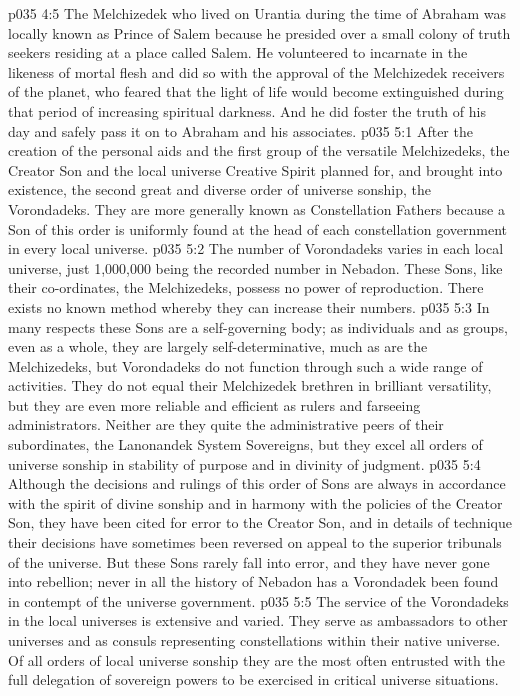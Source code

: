 \vs p035 4:5 \pc The Melchizedek who lived on Urantia during the time of Abraham was locally known as Prince of Salem because he presided over a small colony of truth seekers residing at a place called Salem. He volunteered to incarnate in the likeness of mortal flesh and did so with the approval of the Melchizedek receivers of the planet, who feared that the light of life would become extinguished during that period of increasing spiritual darkness. And he did foster the truth of his day and safely pass it on to Abraham and his associates.
\vs p035 5:1 After the creation of the personal aids and the first group of the versatile Melchizedeks, the Creator Son and the local universe Creative Spirit planned for, and brought into existence, the second great and diverse order of universe sonship, the Vorondadeks. They are more generally known as Constellation Fathers because a Son of this order is uniformly found at the head of each constellation government in every local universe.
\vs p035 5:2 \pc The number of Vorondadeks varies in each local universe, just 1,000,000 being the recorded number in Nebadon. These Sons, like their co\hyp{}ordinates, the Melchizedeks, possess no power of reproduction. There exists no known method whereby they can increase their numbers.
\vs p035 5:3 \pc In many respects these Sons are a self\hyp{}governing body; as individuals and as groups, even as a whole, they are largely self\hyp{}determinative, much as are the Melchizedeks, but Vorondadeks do not function through such a wide range of activities. They do not equal their Melchizedek brethren in brilliant versatility, but they are even more reliable and efficient as rulers and farseeing administrators. Neither are they quite the administrative peers of their subordinates, the Lanonandek System Sovereigns, but they excel all orders of universe sonship in stability of purpose and in divinity of judgment.
\vs p035 5:4 Although the decisions and rulings of this order of Sons are always in accordance with the spirit of divine sonship and in harmony with the policies of the Creator Son, they have been cited for error to the Creator Son, and in details of technique their decisions have sometimes been reversed on appeal to the superior tribunals of the universe. But these Sons rarely fall into error, and they have never gone into rebellion; never in all the history of Nebadon has a Vorondadek been found in contempt of the universe government.
\vs p035 5:5 The service of the Vorondadeks in the local universes is extensive and varied. They serve as ambassadors to other universes and as consuls representing constellations within their native universe. Of all orders of local universe sonship they are the most often entrusted with the full delegation of sovereign powers to be exercised in critical universe situations.
